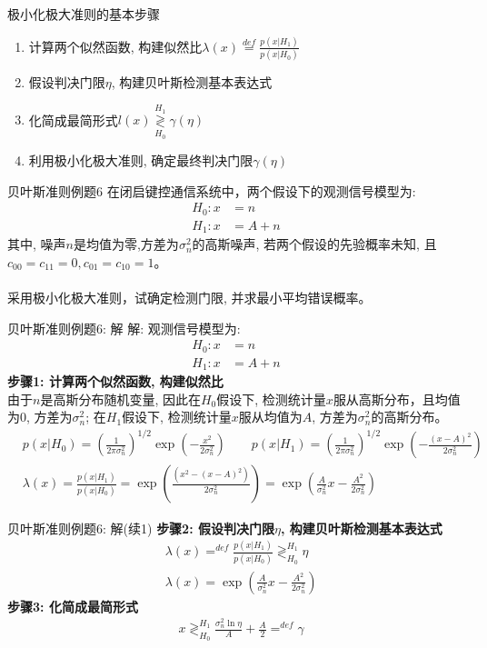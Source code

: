 \begin{frame}{极小化极大准则的基本步骤}
\begin{enumerate}
\setlength{\itemsep}{.5cm}
\item 计算两个似然函数, 构建似然比$\lambda(x)\mathop{=}\limits^{def}\frac{p(x|H_1)}{p(x|H_0)}$
\item 假设判决门限$\eta$, 构建贝叶斯检测基本表达式
\item 化简成最简形式$l(x)\mathop{\gtrless}\limits_{H_0}^{H_1}\gamma(\eta)$
\item 利用极小化极大准则, 确定最终判决门限$\gamma(\eta)$
\end{enumerate}
\end{frame}

\begin{frame}{贝叶斯准则例题6}
在闭启键控通信系统中，两个假设下的观测信号模型为:
\begin{align*}
H_0: x&=n  \\
H_1: x&=A+n
\end{align*}
其中, 噪声$n$是均值为零,方差为$\sigma_n^2$的高斯噪声,  若两个假设的先验概率未知, 且$c_{00}=c_{11}=0, c_{01}=c_{10}=1$。\\
~\\
采用极小化极大准则，试确定检测门限, 并求最小平均错误概率。
\end{frame}

\begin{frame}[shrink]{贝叶斯准则例题6: 解}
解: 观测信号模型为:
\begin{align*}
H_0: x&=n  \\
H_1: x&=A+n
\end{align*}
\textbf{步骤1: 计算两个似然函数, 构建似然比}\\
由于$n$是高斯分布随机变量, 因此在$H_0$假设下, 检测统计量$x$服从高斯分布，且均值为0, 方差为$\sigma_n^2$; 在$H_1$假设下, 检测统计量$x$服从均值为$A$, 方差为$\sigma_n^2$的高斯分布。
\begin{align*}
&p(x|H_0)=\left(\frac{1}{2\pi\sigma_n^2}\right)^{1/2}\exp\left(-\frac{x^2}{2\sigma_n^2}\right) \qquad p(x|H_1)=\left(\frac{1}{2\pi\sigma_n^2}\right)^{1/2}\exp\left(-\frac{(x-A)^2}{2\sigma_n^2}\right)\\
&\lambda(x)=\frac{p(x|H_1)}{p(x|H_0)}=\exp\left(\frac{(x^2-(x-A)^2)}{2\sigma_n^2}\right)=\exp\left(\frac{A}{\sigma_n^2}x-\frac{A^2}{2\sigma_n^2}\right)
\end{align*} 
\end{frame}

\begin{frame}[shrink]{贝叶斯准则例题6: 解(续1)}
\textbf{步骤2: 假设判决门限$\eta$, 构建贝叶斯检测基本表达式}
\begin{align*}
&\lambda(x)\mathop{=}^{def}\frac{p(x|H_1)}{p(x|H_0)}\mathop{\gtrless}_{H_0}^{H_1}\eta\\
&\lambda(x)=\exp\left(\frac{A}{\sigma_n^2}x-\frac{A^2}{2\sigma_n^2}\right)
\end{align*} 
\textbf{步骤3: 化简成最简形式}
\begin{align*}
&x\mathop{\gtrless}_{H_0}^{H_1}\frac{\sigma_n^2\ln\eta}{A}+\frac{A}{2}\mathop{=}^{def}\gamma
\end{align*} 
\end{frame}

